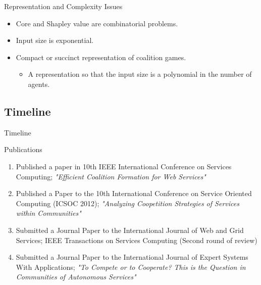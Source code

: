 \documentclass{beamer}
\begin{document}
\begin{frame}{Representation and Complexity Issues}
    \begin{itemize}
        \item Core and Shapley value are combinatorial problems.
        \item Input size is exponential.
        \item Compact or succinct representation of coalition games.
        \begin{itemize}
            \item A representation so that the input size is a polynomial in the number of agents.
        \end{itemize}
    \end{itemize}
\end{frame}


\subsection{Timeline}
\begin{frame}{Timeline}



\end{frame}
\begin{frame}{Publications}

    \begin{enumerate}
        \item Published a paper in 10th IEEE International Conference on Services Computing; \emph{"Efficient Coalition Formation for Web Services"}
        \item Published a Paper to the 10th International Conference on Service Oriented Computing (ICSOC 2012); \emph{"Analyzing Coopetition Strategies of Services within Communities"}
        \item Submitted a Journal Paper to the International Journal of Web and Grid Services; IEEE Transactions on Services Computing {\color{blue} (Second round of review)}
        \item Submitted a Journal Paper to the International Journal of Expert Systems With Applications; \emph{"To Compete or to Cooperate? This is the Question in Communities of Autonomous Services"}
    \end{enumerate}


\end{frame}
\end{document}
